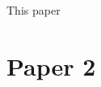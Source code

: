\documentclass[a4paper]{article}
\begin{document}
This paper

\section{Paper 2}





\end{document}
